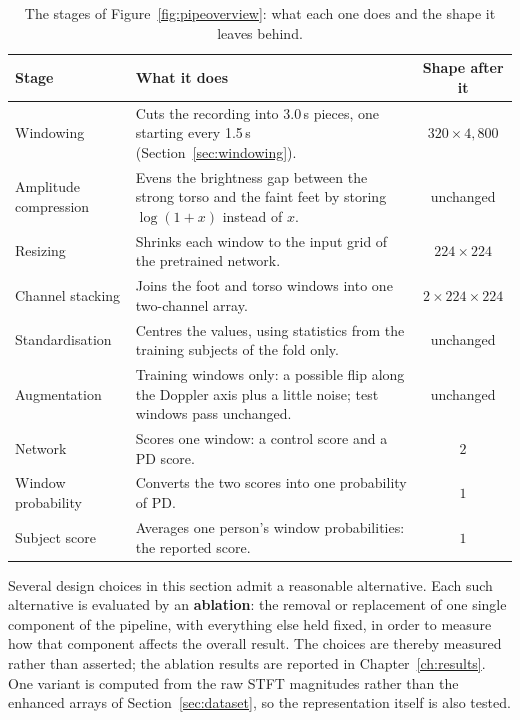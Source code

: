 \begin{table}[H]
  \centering
  \caption[The stages of the deep-learning pipeline]{The stages of Figure~\ref{fig:pipeoverview}: what each one does
  and the shape it leaves behind.}
  \label{tab:reduction}
  \small
  \begin{tabular}{@{}lL{7.4cm}c@{}}
    \toprule
    Stage & What it does & Shape after it \\
    \midrule
    Windowing &
      Cuts the recording into 3.0\,s pieces, one starting every 1.5\,s
      (Section~\ref{sec:windowing}). & $320 \times 4{,}800$ \\
    Amplitude compression &
      Evens the brightness gap between the strong torso and the faint feet
      by storing $\log(1+x)$ instead of $x$. & unchanged \\
    Resizing &
      Shrinks each window to the input grid of the pretrained network. &
      $224 \times 224$ \\
    Channel stacking &
      Joins the foot and torso windows into one two-channel array. &
      $2 \times 224 \times 224$ \\
    Standardisation &
      Centres the values, using statistics from the training subjects of the
      fold only. & unchanged \\
    Augmentation &
      Training windows only: a possible flip along the Doppler axis plus a
      little noise; test windows pass unchanged. & unchanged \\
    Network &
      Scores one window: a control score and a PD score. & $2$ \\
    Window probability &
      Converts the two scores into one probability of PD. & $1$ \\
    Subject score &
      Averages one person's window probabilities: the reported score. &
      $1$ \\
    \bottomrule
  \end{tabular}
\end{table}

Several design choices in this section admit a reasonable alternative. Each
such alternative is evaluated by an \textbf{ablation}: the removal or
replacement of one single component of the pipeline, with everything else held
fixed, in order to measure how that component affects the overall result. The
choices are thereby measured rather than asserted; the ablation results are
reported in Chapter~\ref{ch:results}. One variant is computed from the raw STFT
magnitudes rather than the enhanced arrays of Section~\ref{sec:dataset}, so
the representation itself is also tested.

